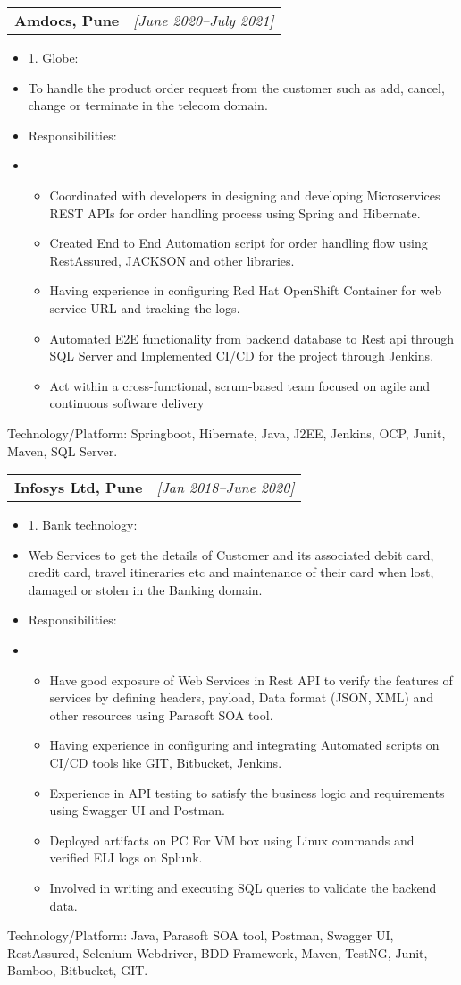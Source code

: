 \documentclass[a4paper,10pt]{article}
\makeatletter
\newcommand{\resitem}[1]{\item #1}
\newcommand{\ressubheading}[3]{\begin{tabular*}{6.62in}{l @{\extracolsep{\fill}} r} \textbf{#1} & \textit{[#2]} \\ \end{tabular*}\vspace{-8pt}}
\makeatother
\begin{document}
\ressubheading{Amdocs, Pune}{June 2020–July 2021}{Software Engineer}
\begin{itemize}[nosep]
    \resitem{1. Globe:}
    \resitem{To handle the product order request from the customer such as add, cancel, change or terminate in the telecom domain.}
    \resitem{Responsibilities:}
    \resitem{\begin{itemize}
        \item Coordinated with developers in designing and developing Microservices REST APIs for order handling process using Spring and Hibernate.
        \item Created End to End Automation script for order handling flow using RestAssured, JACKSON and other libraries.
        \item Having experience in configuring Red Hat OpenShift Container for web service URL and tracking the logs.
        \item Automated E2E functionality from backend database to Rest api through SQL Server and Implemented CI/CD for the project through Jenkins.
        \item Act within a cross-functional, scrum-based team focused on agile and continuous software delivery
    \end{itemize}}
\end{itemize}
Technology/Platform: Springboot, Hibernate, Java, J2EE, Jenkins, OCP, Junit, Maven, SQL Server.

\ressubheading{Infosys Ltd, Pune}{Jan 2018–June 2020}{System Engineer}
\begin{itemize}[nosep]
    \resitem{1. Bank technology:}
    \resitem{Web Services to get the details of Customer and its associated debit card, credit card, travel itineraries etc and maintenance of their card when lost, damaged or stolen in the Banking domain.}
    \resitem{Responsibilities:}
    \resitem{\begin{itemize}
        \item Have good exposure of Web Services in Rest API to verify the features of services by defining headers, payload, Data format (JSON, XML) and other resources using Parasoft SOA tool.
        \item Having experience in configuring and integrating Automated scripts on CI/CD tools like GIT, Bitbucket, Jenkins.
        \item Experience in API testing to satisfy the business logic and requirements using Swagger UI and Postman.
        \item Deployed artifacts on PC For VM box using Linux commands and verified ELI logs on Splunk.
        \item Involved in writing and executing SQL queries to validate the backend data.
    \end{itemize}}
\end{itemize}
Technology/Platform: Java, Parasoft SOA tool, Postman, Swagger UI, RestAssured, Selenium Webdriver, BDD Framework, Maven, TestNG, Junit, Bamboo, Bitbucket, GIT.
\end{document}
